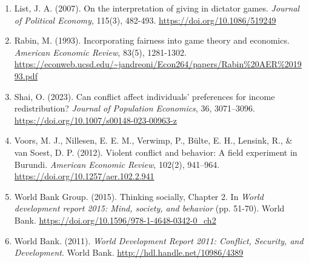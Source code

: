 \documentclass[14pt]{article}
\theoremstyle{remark}
\begin{document}
\begin{enumerate}
    \item List, J. A. (2007). On the interpretation of giving in dictator games. \textit{Journal of Political Economy}, 115(3), 482-493. \url{https://doi.org/10.1086/519249}
    \item Rabin, M. (1993). Incorporating fairness into game theory and economics. \textit{American Economic Review}, 83(5), 1281-1302. \url{https://econweb.ucsd.edu/~jandreoni/Econ264/papers/Rabin\%20AER\%201993.pdf}
    \item Shai, O. (2023). Can conflict affect individuals' preferences for income redistribution? \textit{Journal of Population Economics}, 36, 3071--3096. \url{https://doi.org/10.1007/s00148-023-00963-z}
    \item Voors, M. J., Nillesen, E. E. M., Verwimp, P., Bülte, E. H., Lensink, R., \& van Soest, D. P. (2012). Violent conflict and behavior: A field experiment in Burundi. \textit{American Economic Review}, 102(2), 941--964. \url{https://doi.org/10.1257/aer.102.2.941}
    \item World Bank Group. (2015). Thinking socially, Chapter 2. In \textit{World development report 2015: Mind, society, and behavior} (pp. 51-70). World Bank. \url{https://doi.org/10.1596/978-1-4648-0342-0_ch2}
    \item World Bank. (2011). \textit{World Development Report 2011: Conflict, Security, and Development}. World Bank. \url{http://hdl.handle.net/10986/4389}
\end{enumerate}
\end{document}
